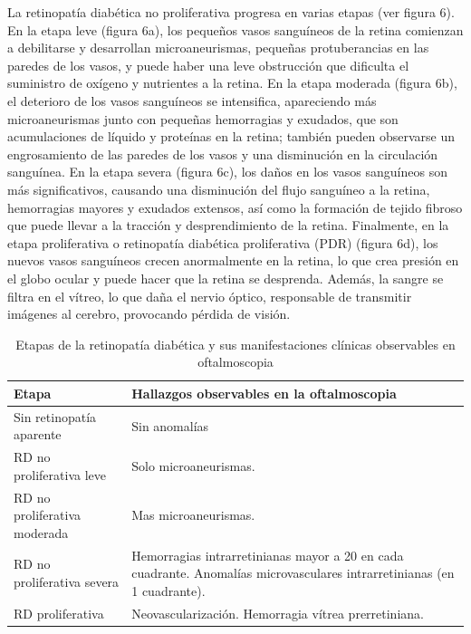 La retinopatía diabética no proliferativa progresa en varias etapas (ver figura 6). En la
etapa leve (figura 6a), los pequeños vasos sanguíneos de la retina comienzan a debilitarse
y desarrollan microaneurismas, pequeñas protuberancias en las paredes de los vasos, y
puede haber una leve obstrucción que dificulta el suministro de oxígeno y nutrientes a la
retina. En la etapa moderada (figura 6b), el deterioro de los vasos sanguíneos se
intensifica, apareciendo más microaneurismas junto con pequeñas hemorragias y exudados,
que son acumulaciones de líquido y proteínas en la retina; también pueden observarse un
engrosamiento de las paredes de los vasos y una disminución en la circulación sanguínea.
En la etapa severa (figura 6c), los daños en los vasos sanguíneos son más significativos,
causando una disminución del flujo sanguíneo a la retina, hemorragias mayores y exudados
extensos, así como la formación de tejido fibroso que puede llevar a la tracción y
desprendimiento de la retina. Finalmente, en la etapa proliferativa o retinopatía
diabética proliferativa (PDR) (figura 6d), los nuevos vasos sanguíneos crecen anormalmente
en la retina, lo que crea presión en el globo ocular y puede hacer que la retina se
desprenda. Además, la sangre se filtra en el vítreo, lo que daña el nervio óptico,
responsable de transmitir imágenes al cerebro, provocando pérdida de visión.


\begin{table}
\centering
\renewcommand{\arraystretch}{1.5} 
\begin{tabularx}{\textwidth}{X X }
\hline
\textbf{Etapa} & \textbf{Hallazgos observables en la oftalmoscopia} \\ \hline
Sin retinopatía aparente & Sin anomalías \\ 
RD no proliferativa leve & Solo microaneurismas. \\ 
RD no proliferativa moderada & Mas microaneurismas. \\ 
RD no proliferativa severa &  Hemorragias intrarretinianas mayor a 20 en cada cuadrante.\newline
Anomalías microvasculares intrarretinianas (en 1 cuadrante). \\
RD proliferativa & Neovascularización. \newline
Hemorragia vítrea prerretiniana.\\ \hline
\end{tabularx}
\caption{Etapas de la retinopatía diabética y sus manifestaciones clínicas observables en
oftalmoscopia }
\end{table}




